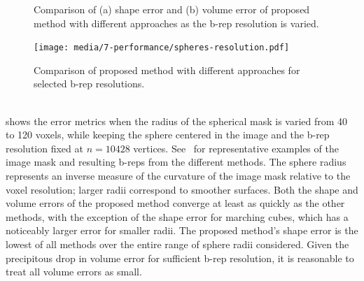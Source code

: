 \begin{figure}[]
\centering
{}
%	
\caption{Comparison of (a) shape error and (b) volume error of proposed method with different approaches as the b-rep resolution is varied.}
\label{fig:graph1}
\end{figure}
\begin{figure}[ht!]
	\centering
	\texttt{[image: media/7-performance/spheres-resolution.pdf]}
	\caption{Comparison of proposed method with different approaches for selected b-rep resolutions.}
	\label{fig:demos1}
\end{figure} \\
%
 shows the error metrics when the radius of the spherical mask is varied from 40 to 120 voxels, while keeping the sphere centered in the image and the b-rep resolution fixed at $n = 10428$ vertices. See~ for representative examples of the image mask and resulting b-reps from the different methods. The sphere radius represents an inverse measure of the curvature of the image mask relative to the voxel resolution; larger radii correspond to smoother surfaces. Both the shape and volume errors of the proposed method converge {at least as quickly as the other methods, with the exception of the shape error for marching cubes, which has a noticeably larger error for smaller radii. The proposed method's shape error is the lowest of all methods over the entire range of sphere radii considered. Given the precipitous drop in volume error for sufficient b-rep resolution, it is reasonable to treat all volume errors as small.}

